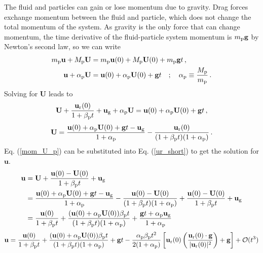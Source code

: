 The fluid and particles can gain or lose momentum due to gravity. Drag forces exchange momentum between the fluid and particle,
which does not change the total momentum of the system. As gravity is the only force that can change momentum, the time derivative
of the fluid-particle system momentum is $m_{\rm p} \mathbf{g}$ by Newton's second law, so we can write
\begin{align}
    m_{\rm p} \mathbf{u} + M_{\rm p} \mathbf{U} &= m_{\rm p} \mathbf{u}(0) + M_{\rm p} \mathbf{U}(0) + m_{\rm p} \mathbf{g} t \,,
\\
    \label{part_mom_cons}
    \mathbf{u} + \alpha_{\rm p} \mathbf{U} &= \mathbf{u}(0) + \alpha_{\rm p} \mathbf{U}(0) + \mathbf{g} t \quad ; \quad
\alpha_{\rm p} \equiv \frac{M_{\rm p}}{m_{\rm p}} \,.
\end{align}
Solving for $\mathbf{U}$ leads to
\begin{align*}
    \mathbf{U} + \frac{\mathbf{u}_{\text{r}}(0)}{1 + \beta_{\rm p} t} + \mathbf{u}_\text{g} + \alpha_{\rm p} \mathbf{U} =
\mathbf{u}(0) + \alpha_{\rm p} \mathbf{U}(0) + \mathbf{g} t \,,
\end{align*}
\begin{align}
    \label{mom_U_p}
    \mathbf{U} = \frac{\mathbf{u}(0) + \alpha_{\rm p} \mathbf{U}(0) + \mathbf{g} t - \mathbf{u}_\text{g}}{1 + \alpha_{\rm p}} -
\frac{\mathbf{u}_{\text{r}}(0)}{(1 + \beta_{\rm p} t)(1 + \alpha_{\rm p})} \,.
\end{align}
Eq. (\ref{mom_U_p}) can be substituted into Eq. (\ref{ur_short}) to get the solution for $\mathbf{u}$.
\begin{align*}
    \mathbf{u} &= \mathbf{U} + \frac{\mathbf{u}(0) - \mathbf{U}(0)}{1 + \beta_{\rm p} t} + \mathbf{u}_\text{g} \\
    &= \frac{\mathbf{u}(0) + \alpha_{\rm p} \mathbf{U}(0) + \mathbf{g} t - \mathbf{u}_\text{g}}{1 + \alpha_{\rm p}} -
\frac{\mathbf{u}(0) - \mathbf{U}(0)}{(1 + \beta_{\rm p} t)(1 + \alpha_{\rm p})} + \frac{\mathbf{u}(0) - \mathbf{U}(0)}{1 +
\beta_{\rm p} t} + \mathbf{u}_\text{g} \\
    &= \frac{\mathbf{u}(0)}{1 + \beta_{\rm p} t} + \frac{(\mathbf{u}(0) + \alpha_{\rm p} \mathbf{U}(0))\beta_{\rm p} t}{(1 +
\beta_{\rm p} t)(1 + \alpha_{\rm p})} + \frac{\mathbf{g} t + \alpha_{\rm p} \mathbf{u}_\text{g}}{1 + \alpha_{\rm p}}
\end{align*}
\begin{align}
    \label{mom_u_p_full}
    \mathbf{u} = \frac{\mathbf{u}(0)}{1 + \beta_{\rm p} t} + \frac{(\mathbf{u}(0) + \alpha_{\rm p} \mathbf{U}(0))\beta_{\rm p}
t}{(1 + \beta_{\rm p} t)(1 + \alpha_{\rm p})} + \mathbf{g} t - \frac{\alpha_{\rm p} \beta_{\rm p} t^2}{2 (1 + \alpha_{\rm p})}
\left[\mathbf{u}_{\text{r}}(0) \left(\frac{\mathbf{u}_{\text{r}}(0) \cdot \mathbf{g}}{|\mathbf{u}_{\text{r}}(0)|^2}\right) +
\mathbf{g}\right] + \mathcal{O}(t^3)
\end{align}

